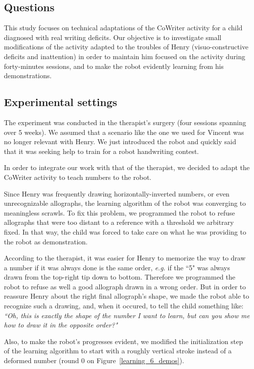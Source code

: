 \documentclass{sig-alternate}
\begin{document}
\subsection{Questions}
This study focuses on technical adaptations of the CoWriter activity for a 
child diagnosed with real writing deficits.
Our objective is to investigate small modifications of the activity adapted to
the troubles of Henry (visuo-constructive deficits and inattention) in order to
maintain him focused
on the activity during forty-minutes sessions, and to make the robot
evidently learning from his demonstrations.

\subsection{Experimental settings}
The experiment was conducted in the therapist's surgery  (four sessions 
spanning over 5 weeks). We assumed that a scenario like the one we used 
for Vincent was no longer relevant with Henry. We just introduced the robot 
and quickly said that it was seeking help to train for a robot handwriting contest.

In order to integrate our work with that of the therapist, we decided to adapt the 
CoWriter activity to teach numbers to the robot.

Since Henry was frequently drawing horizontally-inverted numbers, or even
unrecognizable allographs, the learning algorithm of the robot was converging to
meaningless scrawls. To fix this problem, we programmed the robot to refuse allographs that
were too distant to a reference with a threshold we arbitrary fixed. In that way,
the child was forced to take care on what he was providing to the robot as
demonstration. 

According to the therapist, it was easier for Henry to memorize the way to draw
a number if it was always done is the same order, \emph{e.g.} if the ``5" was always
drawn from the top-right tip down to bottom. Therefore we programmed the robot to
refuse as well a good allograph drawn in a wrong order. But in order to reassure Henry
about the right final allograph's shape, we made the robot able to recognize
such a drawing, and, when it occured, to tell the child something like:
\emph{``Oh, this is exactly the shape of the number I want to learn, but can you
show me how to draw it in the opposite order?"}

Also, to make
the robot's progresses evident, we modified the initialization step of the
learning algorithm to start with a roughly vertical stroke instead of a
deformed number (round 0 on Figure~\ref{learning_6_demos}).
\end{document}

